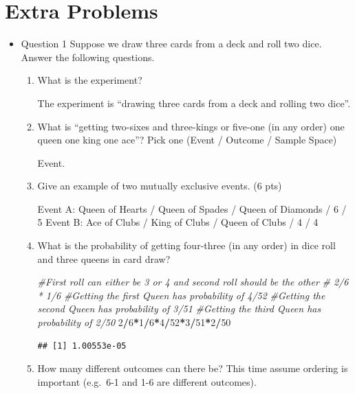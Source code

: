 \documentclass[]{book}
\newenvironment{Shaded}{\begin{snugshade}}{\end{snugshade}}
\newcommand{\CommentTok}[1]{\textcolor[rgb]{0.56,0.35,0.01}{\textit{#1}}}
\newcommand{\DecValTok}[1]{\textcolor[rgb]{0.00,0.00,0.81}{#1}}
\newcommand{\OperatorTok}[1]{\textcolor[rgb]{0.81,0.36,0.00}{\textbf{#1}}}
\theoremstyle{definition}
\theoremstyle{definition}
\theoremstyle{definition}
\theoremstyle{remark}
\begin{document}
\hypertarget{extra-problems}{%
\section{Extra Problems}\label{extra-problems}}

\begin{itemize}
\item
  Question 1 Suppose we draw three cards from a deck and roll two dice.
  Answer the following questions.

  \begin{enumerate}
  \def\labelenumi{\alph{enumi})}
  \item
    What is the experiment?

    The experiment is ``drawing three cards from a deck and rolling two
    dice''.
  \item
    What is ``getting two-sixes and three-kings or five-one (in any
    order) one queen one king one ace''? Pick one (Event / Outcome /
    Sample Space)

    Event.
  \item
    Give an example of two mutually exclusive events. (6 pts)

    Event A: Queen of Hearts / Queen of Spades / Queen of Diamonds / 6 /
    5 Event B: Ace of Clubs / King of Clubs / Queen of Clubs / 4 / 4
  \item
    What is the probability of getting four-three (in any order) in dice
    roll and three queens in card draw?

\begin{Shaded}
\begin{Highlighting}[]
\CommentTok{#First roll can either be 3 or 4 and second roll should be the other}
\CommentTok{# 2/6 * 1/6}
\CommentTok{#Getting the first Queen has probability of 4/52}
\CommentTok{#Getting the second Queen has probability of 3/51}
\CommentTok{#Getting the third Queen has probability of 2/50}
\DecValTok{2}\OperatorTok{/}\DecValTok{6}\OperatorTok{*}\DecValTok{1}\OperatorTok{/}\DecValTok{6}\OperatorTok{*}\DecValTok{4}\OperatorTok{/}\DecValTok{52}\OperatorTok{*}\DecValTok{3}\OperatorTok{/}\DecValTok{51}\OperatorTok{*}\DecValTok{2}\OperatorTok{/}\DecValTok{50}
\end{Highlighting}
\end{Shaded}

\begin{verbatim}
## [1] 1.00553e-05
\end{verbatim}
  \item
    How many different outcomes can there be? This time assume ordering
    is important (e.g.~6-1 and 1-6 are different outcomes).


\end{enumerate}
\end{itemize}
\end{document}
